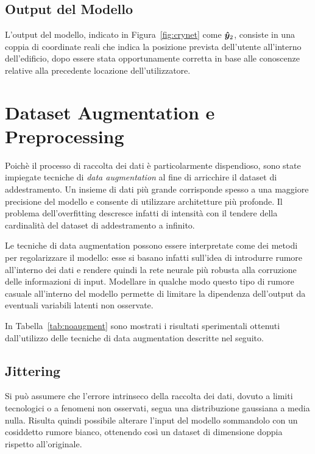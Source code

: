 


\subsection{Output del Modello}
L'output del modello, indicato in Figura~\ref{fig:crynet} come \(\bm\hat{\bm y}_2\),
consiste in una coppia di coordinate reali che indica la posizione prevista
dell'utente all'interno dell'edificio, dopo essere stata opportunamente
corretta in base alle conoscenze relative alla precedente locazione
dell'utilizzatore.
\section{Dataset Augmentation e Preprocessing}\label{sec:augmentation}
Poichè il processo di raccolta dei dati è particolarmente dispendioso, sono
state impiegate tecniche di \emph{data augmentation} al fine di arricchire il
dataset di addestramento. Un insieme di dati più grande corrisponde spesso a
una maggiore precisione del modello e consente di utilizzare architetture più
profonde. Il problema dell'overfitting descresce infatti di intensità con il
tendere della cardinalità del dataset di addestramento a infinito.

Le tecniche di data augmentation possono essere interpretate come dei metodi
per regolarizzare il modello: esse si basano infatti sull'idea di introdurre rumore
all'interno dei dati e rendere quindi la rete neurale più robusta alla
corruzione delle informazioni di input. Modellare in qualche modo questo tipo
di rumore casuale all'interno del modello permette di limitare la dipendenza
dell'output da eventuali variabili latenti non osservate.

In Tabella~\ref{tab:noaugment} sono mostrati i risultati sperimentali ottenuti
dall'utilizzo delle tecniche di data augmentation descritte nel seguito.


\subsection{Jittering}
Si può assumere che l'errore intrinseco della raccolta dei dati, dovuto a
limiti tecnologici o a fenomeni non osservati, segua una distribuzione
gaussiana a media nulla. Risulta quindi possibile alterare l'input del
modello sommandolo con un cosiddetto rumore bianco, ottenendo così un dataset
di dimensione doppia rispetto all'originale. 

